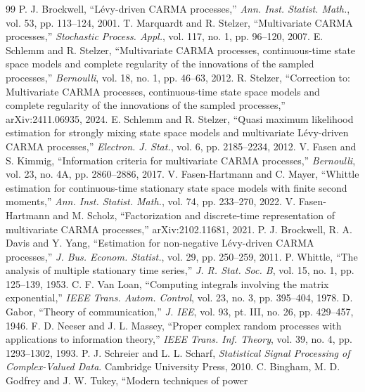 \documentclass[conference]{IEEEtran}
\theoremstyle{bodysmall}
\begin{document}
\begin{thebibliography}{99}
P. J. Brockwell, ``L\'evy-driven CARMA processes,'' \emph{Ann. Inst. Statist.
Math.}, vol. 53, pp. 113--124, 2001.
T. Marquardt and R. Stelzer, ``Multivariate CARMA processes,''
\emph{Stochastic Process. Appl.}, vol. 117, no. 1, pp. 96--120, 2007.
E. Schlemm and R. Stelzer, ``Multivariate CARMA processes, continuous-time
state space models and complete regularity of the innovations of the sampled
processes,'' \emph{Bernoulli}, vol. 18, no. 1, pp. 46--63, 2012.
R. Stelzer, ``Correction to: Multivariate CARMA processes, continuous-time
state space models and complete regularity of the innovations of the sampled
processes,'' arXiv:2411.06935, 2024.
E. Schlemm and R. Stelzer, ``Quasi maximum likelihood estimation for strongly
mixing state space models and multivariate L\'evy-driven CARMA processes,''
\emph{Electron. J. Stat.}, vol. 6, pp. 2185--2234, 2012.
V. Fasen and S. Kimmig, ``Information criteria for multivariate CARMA
processes,'' \emph{Bernoulli}, vol. 23, no. 4A, pp. 2860--2886, 2017.
V. Fasen-Hartmann and C. Mayer, ``Whittle estimation for continuous-time
stationary state space models with finite second moments,'' \emph{Ann. Inst.
Statist. Math.}, vol. 74, pp. 233--270, 2022.
V. Fasen-Hartmann and M. Scholz, ``Factorization and discrete-time
representation of multivariate CARMA processes,'' arXiv:2102.11681, 2021.
P. J. Brockwell, R. A. Davis and Y. Yang, ``Estimation for non-negative
L\'evy-driven CARMA processes,'' \emph{J. Bus. Econom. Statist.}, vol. 29,
pp. 250--259, 2011.
P. Whittle, ``The analysis of multiple stationary time series,'' \emph{J. R.
Stat. Soc. B}, vol. 15, no. 1, pp. 125--139, 1953.
C. F. Van Loan, ``Computing integrals involving the matrix exponential,''
\emph{IEEE Trans. Autom. Control}, vol. 23, no. 3, pp. 395--404, 1978.
D. Gabor, ``Theory of communication,'' \emph{J. IEE}, vol. 93, pt. III,
no. 26, pp. 429--457, 1946.
F. D. Neeser and J. L. Massey, ``Proper complex random processes with
applications to information theory,'' \emph{IEEE Trans. Inf. Theory},
vol. 39, no. 4, pp. 1293--1302, 1993.
P. J. Schreier and L. L. Scharf, \emph{Statistical Signal Processing of
Complex-Valued Data}. Cambridge University Press, 2010.
C. Bingham, M. D. Godfrey and J. W. Tukey, ``Modern techniques of power

\end{thebibliography}
\end{document}
